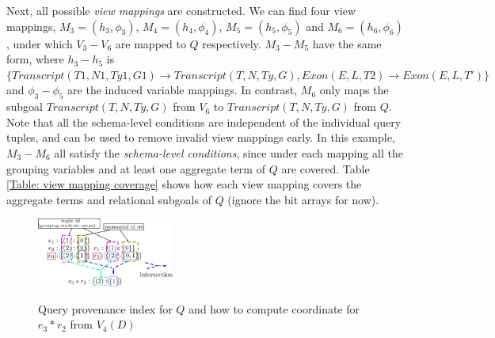 \begin{example}
Next, all possible {\em view mappings} are constructed. We can find four view mappings, $M_3=(h_3,\phi_3)$, $M_4=(h_4, \phi_4)$, $M_5=(h_5, \phi_5)$ and $M_6=(h_6, \phi_6)$, under which $V_3-V_6$ are mapped to $Q$ respectively. $M_3-M_5$ have the same form, where $h_3-h_5$ is $\{Transcript(T1, N1, Ty1, G1) \rightarrow Transcript(T, N, Ty, G), Exon(E, L, T2)\rightarrow Exon(E, L, T')\}$ and $\phi_3-\phi_5$ are the induced variable mappings. In contrast, $M_6$ only maps the subgoal $Transcript(T, N, Ty, G)$ from $V_6$ to $Transcript(T, N, Ty, G)$ from $Q$. Note that all the {schema-level conditions} are independent of the individual query tuples, and can be used to remove invalid view mappings early. In this example, $M_3-M_6$ all satisfy the {\em schema-level conditions}, since under each mapping all the grouping variables and at least one aggregate term of $Q$ are {covered}. Table \ref{Table: view mapping coverage} shows how each view mapping covers the aggregate terms and relational subgoals of $Q$ (ignore the bit arrays for now).

\begin{figure}[t]
    \centering
    \includegraphics[width=0.4\textwidth,height=0.2\textwidth]{Figures/intersection.jpg}
    \caption{Query provenance index for $Q$ and how to compute coordinate for $e_3*r_2$ from $V_4(D)$}
    \small \label{fig:query prov index}
\end{figure}


\end{example}
